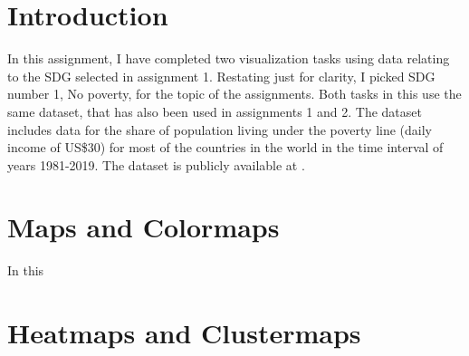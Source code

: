 \documentclass[11pt,a4paper,titlepage]{article}
\begin{document}



\section*{Introduction}
In this assignment, I have completed two visualization tasks using data relating to the SDG selected in assignment 1. Restating just for clarity, I picked SDG number 1, No poverty, for the topic of the assignments. Both tasks in this use the same dataset, that has also been used in assignments 1 and 2. The dataset includes data for the share of population living under the poverty line (daily income of US\$30) for most of the countries in the world in the time interval of years 1981-2019. The dataset is publicly available at \cite{data}.

\section{Maps and Colormaps}

In this

\section{Heatmaps and Clustermaps}


\end{document}
